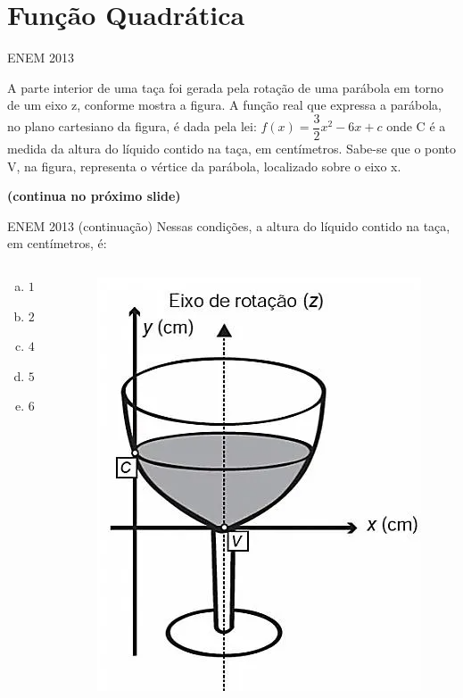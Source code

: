 \documentclass[11pt]{beamer}
\begin{document}
\section{Função Quadrática}

\begin{frame}{ENEM 2013}
    
    A parte interior de uma taça foi gerada pela rotação de uma parábola em torno de um eixo z, conforme mostra a figura. A função real que expressa a parábola, no plano cartesiano da figura, é dada pela lei: $f(x)=\dfrac{3}{2}x^{2}-6x+c$ onde C é a medida da altura do líquido contido na taça, em centímetros. Sabe-se que o ponto V, na figura, representa o vértice da parábola, localizado sobre o eixo x. 

    \vfill
    \textbf{(continua no próximo slide)}
    
\end{frame}

\begin{frame}{ENEM 2013 (continuação)}
    Nessas condições, a altura do líquido contido na taça, em centímetros, é:
    \begin{columns}
        \begin{column}{0.4\textwidth}
            \begin{enumerate}[a)]
                \item $1$ 
                \item $2$  
                \item $4$
                \item $5$ 
                \item $6$ %
            \end{enumerate}
        \end{column}

        \begin{column}{0.6\textwidth}
            \centering
            \includegraphics[width=0.7\linewidth]{imagens/enem 2013.png}
        \end{column}
    \end{columns}
    
\end{frame}
\end{document}
